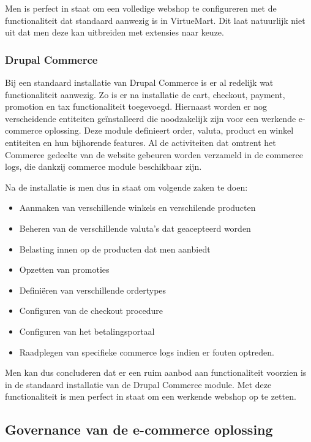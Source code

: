 Men is perfect in staat om een volledige webshop te configureren met de functionaliteit dat standaard aanwezig is in VirtueMart. Dit laat natuurlijk niet uit dat men deze kan uitbreiden met extensies naar keuze.

\subsubsection{Drupal Commerce}
Bij een standaard installatie van Drupal Commerce is er al redelijk wat functionaliteit aanwezig. Zo is er na installatie de cart, checkout, payment, promotion en tax functionaliteit toegevoegd. Hiernaast worden er nog verscheidende entiteiten geïnstalleerd die noodzakelijk zijn voor een werkende e-commerce oplossing. Deze module definieert order, valuta, product en winkel entiteiten en hun bijhorende features. Al de activiteiten dat omtrent het Commerce gedeelte van de website gebeuren worden verzameld in de commerce logs, die dankzij commerce module beschikbaar zijn. 

Na de installatie is men dus in staat om volgende zaken te doen:
\begin{itemize}
	\item Aanmaken van verschillende winkels en verschilende producten
	\item Beheren van de verschillende valuta's dat geacepteerd worden
	\item Belasting innen op de producten dat men aanbiedt
	\item Opzetten van promoties 
	\item Definiëren van verschillende ordertypes
	\item Configuren van de checkout procedure
	\item Configuren van het betalingsportaal
	\item Raadplegen van specifieke commerce logs indien er fouten optreden.
\end{itemize}

Men kan dus concluderen dat er een ruim aanbod aan functionaliteit voorzien is in de standaard installatie van de Drupal Commerce module. Met deze functionaliteit is men perfect in staat om een werkende webshop op te zetten.
\subsection{Governance van de e-commerce oplossing}
